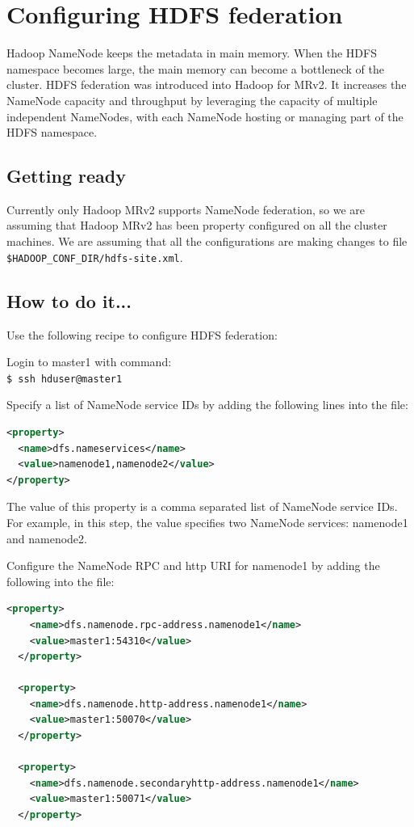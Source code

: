 \section{Configuring HDFS federation}
Hadoop NameNode keeps the metadata in main memory. When the HDFS namespace becomes large, the main memory can become a bottleneck of the cluster. HDFS federation was introduced into Hadoop for MRv2. It increases the NameNode capacity and throughput by leveraging the capacity of multiple independent NameNodes, with each NameNode hosting or managing part of the HDFS namespace.
\subsection*{Getting ready}
Currently only Hadoop MRv2 supports NameNode federation, so we are assuming that Hadoop MRv2 has been property configured on all the cluster machines.
We are assuming that all the configurations are making changes to file \verb|$HADOOP_CONF_DIR/hdfs-site.xml|.
\subsection*{How to do it...}
 Use the following recipe to configure HDFS federation:

Login to master1 with command: \\
\verb|$ ssh hduser@master1|

Specify a list of NameNode service IDs by adding the following lines into the file:
\lstset{style=bashstyle}
\begin{lstlisting}[language=XML]
<property>
  <name>dfs.nameservices</name>
  <value>namenode1,namenode2</value>
</property>
\end{lstlisting}

The value of this property is a comma separated list of NameNode service IDs. For example, in this step, the value specifies two NameNode services: namenode1 and namenode2.

Configure the NameNode RPC and http URI for namenode1 by adding the following into the file:
\lstset{style=bashstyle}
\begin{lstlisting}[language=XML]
<property>
    <name>dfs.namenode.rpc-address.namenode1</name>
    <value>master1:54310</value>
  </property>

  <property>
    <name>dfs.namenode.http-address.namenode1</name>
    <value>master1:50070</value>
  </property>

  <property>
    <name>dfs.namenode.secondaryhttp-address.namenode1</name>
    <value>master1:50071</value>
  </property>
\end{lstlisting}

